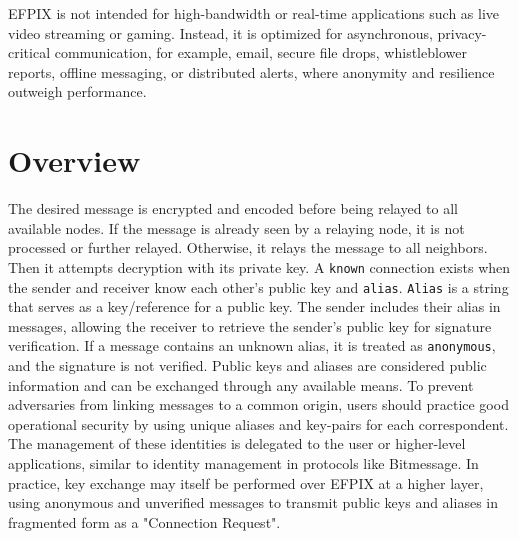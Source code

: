 \documentclass{article}
\begin{document}
EFPIX is not intended for high-bandwidth or real-time applications such as live video streaming or gaming. Instead, it is optimized for asynchronous, privacy-critical communication, for example, email, secure file drops, whistleblower reports, offline messaging, or distributed alerts, where anonymity and resilience outweigh performance.

\section{Overview}
The desired message is encrypted and encoded before being relayed to all available nodes. If the message is already seen by a relaying node, it is not processed or further relayed. Otherwise, it relays the message to all neighbors. Then it attempts decryption with its private key.
A \texttt{known} connection exists when the sender and receiver know each other’s public key and \texttt{alias}. \texttt{Alias} is a string that serves as a key/reference for a public key. The sender includes their alias in messages, allowing the receiver to retrieve the sender’s public key for signature verification. If a message contains an unknown alias, it is treated as \texttt{anonymous}, and the signature is not verified. Public keys and aliases are considered public information and can be exchanged through any available means. To prevent adversaries from linking messages to a common origin, users should practice good operational security by using unique aliases and key-pairs for each correspondent. The management of these identities is delegated to the user or higher-level applications, similar to identity management in protocols like Bitmessage. In practice, key exchange may itself be performed over EFPIX at a higher layer, using anonymous and unverified messages to transmit public keys and aliases in fragmented form as a "Connection Request".
\end{document}
